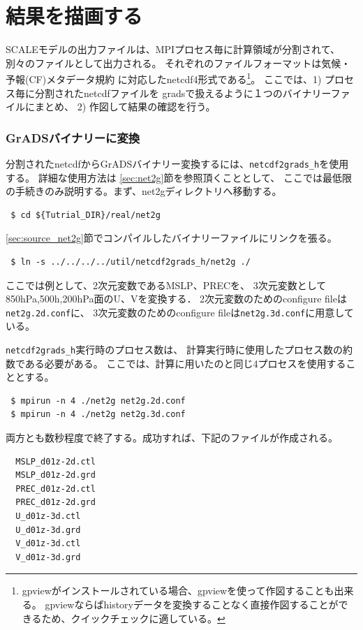 \section{結果を描画する}
\label{sec:quicklook}

SCALEモデルの出力ファイルは、MPIプロセス毎に計算領域が分割されて、別々のファイルとして出力される。
それぞれのファイルフォーマットは気候・予報(CF)メタデータ規約
に対応したnetcdf4形式である\footnote{gpviewがインストールされている場合、gpviewを使って作図することも出来る。
gpviewならばhistoryデータを変換することなく直接作図することができるため、クイックチェックに適している。}。
ここでは、1) プロセス毎に分割されたnetcdfファイルを
gradsで扱えるように１つのバイナリーファイルにまとめ、
2) 作図して結果の確認を行う。


\subsubsection{GrADSバイナリーに変換}
分割されたnetcdfからGrADSバイナリー変換するには、\verb|netcdf2grads_h|を使用する。
詳細な使用方法は \ref{sec:net2g}節を参照頂くこととして、
ここでは最低限の手続きのみ説明する。まず、net2gディレクトリへ移動する。
\begin{verbatim}
 $ cd ${Tutrial_DIR}/real/net2g
\end{verbatim}

\ref{sec:source_net2g}節でコンパイルしたバイナリーファイルにリンクを張る。
\begin{verbatim}
 $ ln -s ../../../../util/netcdf2grads_h/net2g ./
\end{verbatim}
ここでは例として、2次元変数であるMSLP、PRECを、
3次元変数として850hPa,500h,200hPa面のU、Vを変換する．
2次元変数のためのconfigure fileは\verb|net2g.2d.conf|に、
3次元変数のためのconfigure fileは\verb|net2g.3d.conf|に用意している。

\verb|netcdf2grads_h|実行時のプロセス数は、
計算実行時に使用したプロセス数の約数である必要がある。
ここでは、計算に用いたのと同じ4プロセスを使用することとする。
\begin{verbatim}
 $ mpirun -n 4 ./net2g net2g.2d.conf
 $ mpirun -n 4 ./net2g net2g.3d.conf
\end{verbatim}
両方とも数秒程度で終了する。成功すれば、下記のファイルが作成される。
\begin{verbatim}
  MSLP_d01z-2d.ctl
  MSLP_d01z-2d.grd
  PREC_d01z-2d.ctl
  PREC_d01z-2d.grd
  U_d01z-3d.ctl
  U_d01z-3d.grd
  V_d01z-3d.ctl
  V_d01z-3d.grd
\end{verbatim}


